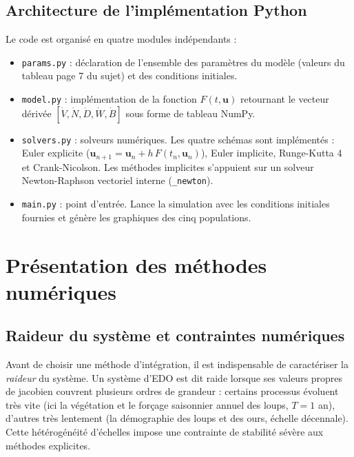 \documentclass[12pt,a4paper]{article}
\begin{document}
\subsection{Architecture de l'implémentation Python}

Le code est organisé en quatre modules indépendants :

\begin{itemize}
    \item \texttt{params.py} : déclaration de l'ensemble des paramètres du modèle
    (valeurs du tableau page 7 du sujet) et des conditions initiales.
    \item \texttt{model.py} : implémentation de la fonction $F(t, \mathbf{u})$ retournant
    le vecteur dérivée $[\dot{V}, \dot{N}, \dot{D}, \dot{W}, \dot{B}]$ sous forme de
    tableau NumPy.
    \item \texttt{solvers.py} : solveurs numériques. Les quatre schémas sont implémentés :
    Euler explicite ($\mathbf{u}_{n+1} = \mathbf{u}_n + h\, F(t_n, \mathbf{u}_n)$),
    Euler implicite, Runge-Kutta 4 et Crank-Nicolson. Les méthodes implicites
    s'appuient sur un solveur Newton-Raphson vectoriel interne (\texttt{\_newton}).
    \item \texttt{main.py} : point d'entrée. Lance la simulation avec les conditions
    initiales fournies et génère les graphiques des cinq populations.
\end{itemize}



\section{Présentation des méthodes numériques}

\subsection{Raideur du système et contraintes numériques}

Avant de choisir une méthode d'intégration, il est indispensable de caractériser la
\emph{raideur} du système. Un système d'EDO est dit raide lorsque ses valeurs propres
de jacobien couvrent plusieurs ordres de grandeur : certains processus évoluent très vite
(ici la végétation et le forçage saisonnier annuel des loups, $T = 1$ an), d'autres très
lentement (la démographie des loups et des ours, échelle décennale). Cette hétérogénéité
d'échelles impose une contrainte de stabilité sévère aux méthodes explicites.
\end{document}
